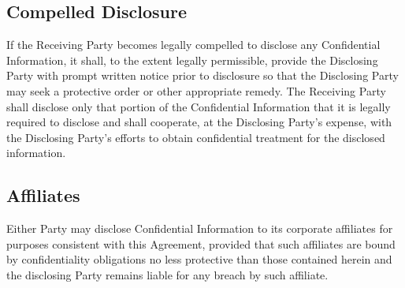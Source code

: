 \subsection{Compelled Disclosure} If the Receiving Party becomes legally compelled to disclose any Confidential Information, it shall, to the extent legally permissible, provide the Disclosing Party with prompt written notice prior to disclosure so that the Disclosing Party may seek a protective order or other appropriate remedy. The Receiving Party shall disclose only that portion of the Confidential Information that it is legally required to disclose and shall cooperate, at the Disclosing Party's expense, with the Disclosing Party's efforts to obtain confidential treatment for the disclosed information.

\subsection{Affiliates} Either Party may disclose Confidential Information to its corporate affiliates for purposes consistent with this Agreement, provided that such affiliates are bound by confidentiality obligations no less protective than those contained herein and the disclosing Party remains liable for any breach by such affiliate.

